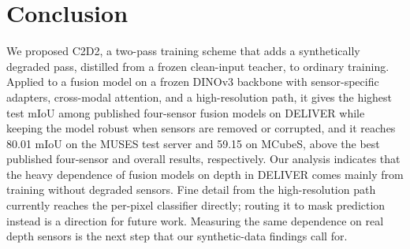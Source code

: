 \let\paperFloatBarrier\FloatBarrier\let\FloatBarrier\relax
\section{Conclusion}\label{sec:conclusion}
\let\FloatBarrier\paperFloatBarrier
We proposed C2D2, a two-pass training scheme that adds a synthetically degraded pass, distilled from a frozen clean-input teacher, to ordinary training. Applied to a fusion model on a frozen DINOv3 backbone with sensor-specific adapters, cross-modal attention, and a high-resolution path, it gives the highest test mIoU among published four-sensor fusion models on DELIVER while keeping the model robust when sensors are removed or corrupted, and it reaches 80.01 mIoU on the MUSES test server and 59.15 on MCubeS, above the best published four-sensor and overall results, respectively. Our analysis indicates that the heavy dependence of fusion models on depth in DELIVER comes mainly from training without degraded sensors. Fine detail from the high-resolution path currently reaches the per-pixel classifier directly; routing it to mask prediction instead is a direction for future work. Measuring the same dependence on real depth sensors is the next step that our synthetic-data findings call for.
\FloatBarrier
